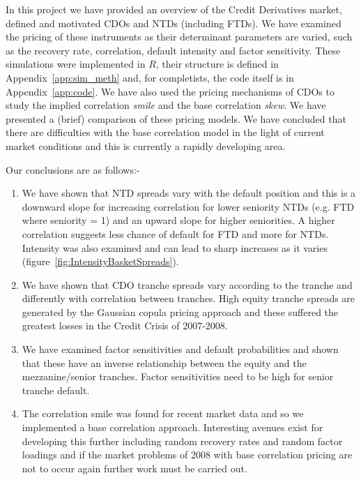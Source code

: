In this project we have provided an overview of the Credit Derivatives market, defined and motivated CDOs and NTDs (including FTDs). We have examined the pricing of these instruments as their determinant parameters are varied, such as the recovery rate, correlation, default intensity and factor sensitivity.  These simulations were implemented in $R$, their structure is defined in Appendix~\ref{app:sim_meth} and, for completists, the code itself is in Appendix~\ref{app:code}.  We have also used the pricing mechanisms of CDOs to study the implied correlation {\em smile} and the base correlation {\em skew}.  We have presented a (brief) comparison of these pricing models. We have concluded that there are difficulties with the base correlation model in the light of current market conditions and this is currently a rapidly developing area.

\medskip

Our conclusions are as follows:-
\begin{enumerate}
\item	We have shown that NTD spreads vary with the default position and this is a downward slope for increasing correlation for lower seniority NTDs (e.g. FTD where seniority = 1) and an upward slope for higher seniorities.  A higher correlation suggests less chance of default for FTD and more for NTDs. Intensity was also examined and can lead to sharp increases as it varies (figure~\ref{fig:IntensityBasketSpreads}).
\item	We have shown that CDO tranche spreads vary according to the tranche and differently with correlation between tranches. High equity tranche spreads are generated by the Gaussian copula pricing approach and these suffered the greatest losses in the Credit Crisis of 2007-2008.
\item We have examined factor sensitivities and default probabilities and shown that these have an inverse relationship between the equity and the mezzanine/senior tranches. Factor sensitivities need to be high for senior tranche default.
\item The correlation smile was found for recent market data and so we implemented a base correlation approach. Interesting avenues exist for developing this further including random recovery rates and random factor loadings and if the market problems of 2008 with base correlation pricing are not to occur again further work must be carried out.
\end{enumerate}




